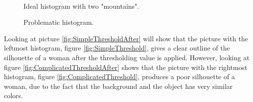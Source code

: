 \begin{figure}[htbp]
\begin{minipage}[b]{0.45\textwidth}
\end{minipage} \\ %
\begin{minipage}[t]{0.45\textwidth}
\caption{Ideal histogram with two "mountains".} %
\label{fig:SimpleThreshold}
\end{minipage} \hfill
\begin{minipage}[t]{0.45\textwidth}
\caption{Problematic histogram.} %
\label{fig:ComplicatedThreshold}
\end{minipage}
\end{figure}

Looking at picture \eqref{fig:SimpleThresholdAfter} will show that the picture with the leftmost histogram, figure \eqref{fig:SimpleThreshold}, gives a clear outline of the silhouette of a woman after the thresholding value is applied. However, looking at figure \eqref{fig:ComplicatedThresholdAfter} shows that the picture with the rightmost histogram, figure \eqref{fig:ComplicatedThreshold}, produces a poor silhouette of a woman, due to the fact that the background and the object has very similar colors. 

